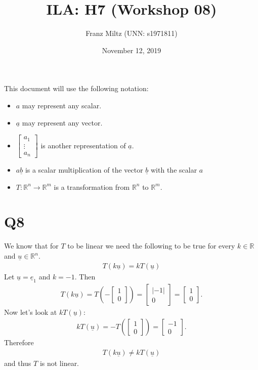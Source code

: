 \documentclass{article}
\title{ILA: H7 (Workshop 08)}
\author{Franz Miltz (UNN: s1971811)}
\date{November 12, 2019}
\renewcommand{\vec}{\underline}
\begin{document}
\maketitle
This document will use the following notation:
\begin{itemize}
    \item $a$ may represent any scalar.
    \item $\vec{a}$ may represent any vector.
    \item $\begin{bmatrix}
        a_1\\
        \vdots\\
        a_n
    \end{bmatrix}$ is another representation of $\vec a$. 
    \item $a\vec{b}$ is a scalar multiplication of the vector $\vec{b}$ with the scalar $a$
    \item $T:\mathbb{R}^n\to\mathbb{R}^m$ is a transformation from $\mathbb{R}^n$ to $\mathbb{R}^m$.
\end{itemize}
\section*{Q8}
We know that for $T$ to be linear we need the following to be true for every $k\in\mathbb{R}$ and $\vec u \in\mathbb{R}^n$. 
\begin{align*}
    T(k\vec u) = k T(\vec u)
\end{align*}
Let $\vec u = \vec e_1$ and $k = -1$. Then
\begin{align*}
    T(k\vec u) = T\left(-\begin{bmatrix}
        1\\ 0
    \end{bmatrix}\right) = 
    \begin{bmatrix}
        |-1|\\ 0
    \end{bmatrix} =
    \begin{bmatrix}
        1\\0
    \end{bmatrix}.
\end{align*}
Now let's look at $kT(\vec u)$:
\begin{align*}
    kT(\vec u) = -T\left(\begin{bmatrix}
        1\\ 0
    \end{bmatrix}\right)
    = \begin{bmatrix}
        -1\\ 0
    \end{bmatrix}.
\end{align*}
Therefore
\begin{align*}
    T(k\vec u) \not= kT(\vec u)
\end{align*}
and thus $T$ is not linear.
\end{document}
